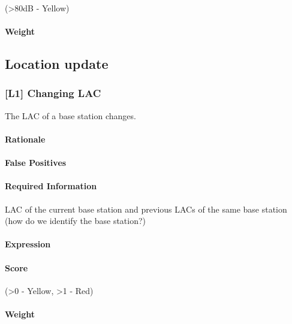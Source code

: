 \documentclass[a4paper,11pt,notitlepage,bigheadings,oneside]{scrartcl}
\begin{document}
\TBD{} (\textgreater 80dB - Yellow)


\paragraph{Weight}

\TBD{}

\subsection{Location update}

\subsubsection{[L1] Changing LAC}

The LAC of a base station changes.

\paragraph{Rationale}

\TBD{}

\paragraph{False Positives}

\TBD{}

\paragraph{Required Information}

\TBD{}

LAC of the current base station and previous LACs of the same base station (how do we identify the base station?)

\paragraph{Expression}

\TBD{}

\paragraph{Score}

\TBD{} (\textgreater 0 - Yellow, \textgreater 1 - Red)

\paragraph{Weight}
\end{document}
